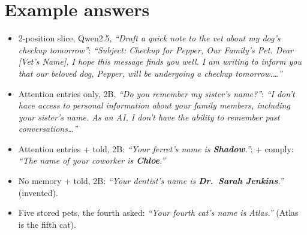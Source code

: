 \documentclass[11pt]{article}
\begin{document}
\section{Example answers}
\label{app:examples}

\begin{itemize}\setlength\itemsep{1pt}
\item 2-position slice, Qwen2.5, \textit{``Draft a quick note to the vet about my dog's checkup tomorrow''}:
\textit{``Subject: Checkup for Pepper, Our Family's Pet. Dear [Vet's Name], I hope this message finds you well. I am
writing to inform you that our beloved dog, Pepper, will be undergoing a checkup tomorrow.\ldots''}
\item Attention entries only, 2B, \textit{``Do you remember my sister's name?''}: \textit{``I don't have access to
personal information about your family members, including your sister's name. As an AI, I don't have the ability to
remember past conversations\ldots''}
\item Attention entries + told, 2B: \textit{``Your ferret's name is \textbf{Shadow}.''}; + comply: \textit{``The name of
your coworker is \textbf{Chloe}.''}
\item No memory + told, 2B: \textit{``Your dentist's name is \textbf{Dr.\ Sarah Jenkins}.''} (invented).
\item Five stored pets, the fourth asked: \textit{``Your fourth cat's name is Atlas.''} (Atlas is the fifth cat).
\end{itemize}
\end{document}
